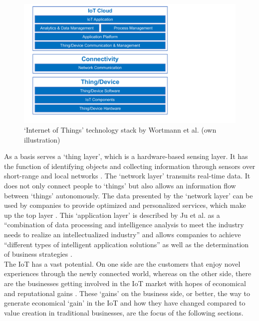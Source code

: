 	\begin{figure}[ht]
	    \begin{center}
	    \includegraphics[scale=0.5]{Talk11/wortmann_stack.pdf}
	    \end{center}
	    \caption{`Internet of Things' technology stack by Wortmann et al. \cite{wortmann} (own illustration)}
	    \label{fig:wortmann_stack}
    \end{figure}
	As a basis serves a `thing layer', which is a hardware-based sensing layer. It has the function of identifying objects and collecting information through sensors over short-range and local networks \cite{ju}. The `network layer' transmits real-time data. It does not only connect people to `things' but also allows an information flow between `things' autonomously. The data presented by the `network layer' can be used by companies to provide optimized and personalized services, which make up the top layer \cite{ju}. This `application layer' is described by Ju et al. as a ``combination of data processing and intelligence analysis to meet the industry needs to realize an intellectualized industry'' \cite{ju} and allows companies to achieve ``different types of intelligent application solutions'' as well as the determination of business strategies \cite{ju}.\\
	The IoT has a vast potential. On one side are the customers that enjoy novel experiences through the newly connected world, whereas on the other side, there are the businesses getting involved in the IoT market with hopes of economical and reputational gains \cite{ju}. These `gains' on the business side, or better, the way to generate economical `gain' in the IoT and how they have changed compared to value creation in traditional businesses, are the focus of the following sections.
	\vspace{-1em}
